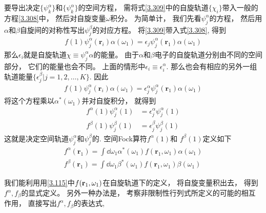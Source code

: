 要导出决定$\{\psi_k^\alpha \}$和$\{\psi_k^\alpha \}$的空间方程，
需将式\eqref{3.309}中的自旋轨道$\{\chi_i\}$带入一般的\hft 方程\eqref{3.308}中，
然后对自旋变量$\omega$积分。
为简单计，
我们先看$\psi_j^\alpha$的方程，
然后用$\alpha$和$\beta$自旋间的对称性写出$\psi_j^\beta$的对应方程。
将\eqref{3.309}带入式\eqref{3.308}, 
得到
\begin{align}\label{3.310}
	f(1)\psi_j^\alpha(\mathbf{r}_i) \alpha(\omega_1) = \epsilon_j \psi_j^\alpha(\mathbf{r}_1) \alpha(\omega_1)
\end{align}
那么$\epsilon_i$就是自旋轨道$\chi\equiv\psi_j^\alpha\alpha$的能量。
由于$\alpha$和$\beta$电子的自旋轨道分别由不同的空间部分，
它们的能量也会不同。
上面的情形中$\epsilon_i\equiv\epsilon^\alpha_i$. 
那么也会有相应的另外一组轨道能量$\{\epsilon_j^\beta | j=1,2,\ldots,K\}$. 
因此
\begin{align}\label{3.311}
	f(1)\psi_j^\alpha(\mathbf{r}_i) \alpha(\omega_1) = \epsilon_j^\alpha \psi_j^\alpha(\mathbf{r}_1) \alpha(\omega_1)
\end{align}
将这个方程乘以$\alpha^*(\omega_1)$并对自旋积分，
就得到
\begin{align}
	f^\alpha(1)\psi_j^\alpha(1) & = \epsilon_j^\alpha \psi_j^\alpha(1) \label{3.312}\\
	f^\beta (1)\psi_j^\beta(1)  & = \epsilon_j^\beta \psi_j^\beta(1)\label{3.313}
\end{align}
这就是决定空间轨道$\psi_j^\alpha$和$\psi_j^\beta$的. 
空间Fock算符$f^\alpha(1)$和 $f^\beta (1)$定义如下
\begin{align}
	f^\alpha(\mathbf{r}_1) = \int\dd\omega_1 \alpha^*(\omega_1) f(\mathbf{r}_1,\omega_1)\alpha(\omega_1) \label{3.314}\\
	f^\beta(\mathbf{r}_1) = \int\dd\omega_1 \beta^*(\omega_1) f(\mathbf{r}_1,\omega_1)\beta(\omega_1) \label{3.315}
\end{align}

我们能利用用\eqref{3.115}中$f(\mathbf{r}_1,\omega_1)$在自旋轨道下的定义，
将自旋变量积出去，
得到$f^\alpha,f_\beta$的显式定义。
另外一种办法是，
考察非限制性行列式所定义的可能的相互作用，
直接写出$f^\alpha,f_\beta$的表达式,

